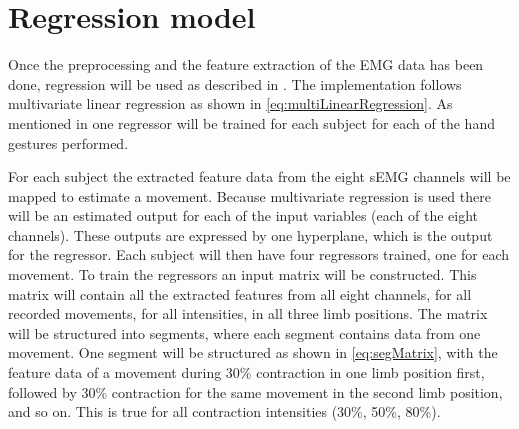 \section{Regression model}


Once the preprocessing and the feature extraction of the EMG data has been done, regression will be used as described in . The implementation follows multivariate linear regression as shown in \eqref{eq:multiLinearRegression}. As mentioned in  one regressor will be trained for each subject for each of the hand gestures performed. 

For each subject the extracted feature data from the eight sEMG channels will be mapped to estimate a movement. Because multivariate regression is used there will be an estimated output for each of the input variables (each of the eight channels). These outputs are expressed by one hyperplane, which is the output for the regressor. Each subject will then have four regressors trained, one for each movement. 
To train the regressors an input matrix will be constructed. This matrix will contain all the extracted features from all eight channels, for all recorded movements, for all intensities, in all three limb positions. The matrix will be structured into segments, where each segment contains data from one movement. One segment will be structured as shown in \eqref{eq:segMatrix}, with the feature data of a movement during 30\% contraction in one limb position first, followed by 30\% contraction for the same movement in the second limb position, and so on. This is true for all contraction intensities (30\%, 50\%, 80\%).

